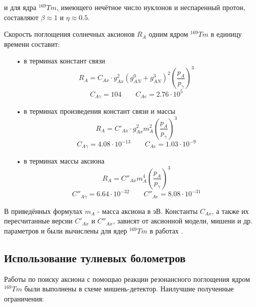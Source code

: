 \documentclass[a4paper,article,14pt]{extarticle}
\begin{document}
и для ядра $^{169}Tm$, имеющего нечётное число нуклонов и неспаренный протон, составляют $\beta \approx 1$ и $\eta \approx 0.5$. 

Скорость поглощения солнечных аксионов $R_A$ одним ядром $^{169}Tm$ в единицу времени составит:
\begin{enumerate}
    \item[•] в терминах констант связи
    \begin{equation}
    \label{RAg1}
        {R_A} = {C_{Ax}} \cdot g_{Ax}^2{\left( {g_{AN}^0 + g_{AN}^3} \right)^2}{\left( {\frac{{{p_A}}}{{{p_\gamma }}}} \right)^3}
    \end{equation}
    \begin{equation}
        C_{A\gamma } = 104 \qquad C_{Ae} = 2.76 \cdot {10^5}
    \end{equation}
    \item[•] в терминах произведения констант связи и массы
    \begin{equation}
    \label{RAg}
        {R_A} = {C'_{Ax}} \cdot g_{Ax}^2 m_A^2{\left( {\frac{{{p_A}}}{{{p_\gamma }}}} \right)^3}
    \end{equation}
    \begin{equation}
        C_{A\gamma } = 4.08 \cdot {10^{-13}} \qquad C_{Ae} = 1.03 \cdot {10^{-9}}
    \end{equation}
    \item[•] в терминах массы аксиона
    \begin{equation}
    \label{RAm}
   {R_A} = {C''_{Ax}}m_A^4{\left( {\frac{{{p_A}}}{{{p_\gamma }}}} \right)^3}
\end{equation}
\begin{equation}
        C''_{A\gamma } = 6.64 \cdot 10^{-32} \qquad
        C''_{Ae} = 8.08 \cdot 10^{-31}
    \end{equation}
\end{enumerate}

В приведённых формулах $m_A$ - масса аксиона в эВ. Константы $C_{Ax }$, а также их пересчитанные версии $C'_{Ax }$ и $C''_{Ax }$, зависят от аксионной модели, мишени и др. параметров и были вычислены для ядер $^{169}Tm$ в работах \cite{Derbin2009,redondo2013solar}.



\subsection{Использование тулиевых  болометров}

Работы \cite{Derbin2007,Derbin2009, derbin2011constraints} по поиску аксиона с помощью реакции резонансного поглощения ядром $^{169}Tm$ были выполнены в схеме мишень-детектор. Наилучшие полученные ограничения:
\end{document}
